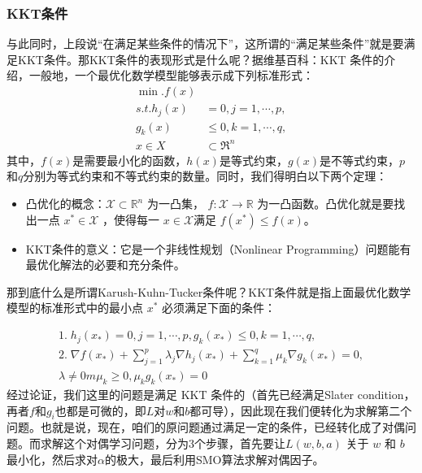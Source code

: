 \documentclass[a4paper,12pt]{article}
\begin{document}
\subsubsection{KKT条件}
与此同时，上段说“在满足某些条件的情况下”，这所谓的“满足某些条件”就是要满足KKT条件。那KKT条件的表现形式是什么呢？据维基百科：KKT 条件的介绍，一般地，一个最优化数学模型能够表示成下列标准形式：
\begin{equation}
\begin{split}
  \min.f(x)\\
  s.t. h_j(x)&=0,j=1,\cdots,p,\\
  g_k(x)&\leq0,k=1,\cdots,q,\\
  x\in X&\subset\Re^n
\end{split}
\end{equation}
其中，$f(x)$是需要最小化的函数，$h(x)$是等式约束，$g(x)$是不等式约束，$p$和$q$分别为等式约束和不等式约束的数量。同时，我们得明白以下两个定理：
\begin{itemize}
  \item 凸优化的概念：$\mathcal{X} \subset \mathbb{R}^n$ 为一凸集， $f:\mathcal{X}\to \mathbb{R}$ 为一凸函数。凸优化就是要找出一点 $x^\ast \in \mathcal{X}$ ，使得每一 $x \in \mathcal{X} $满足 $f(x^\ast)\le f(x) $。
  \item KKT条件的意义：它是一个非线性规划（Nonlinear Programming）问题能有最优化解法的必要和充分条件。
\end{itemize}

那到底什么是所谓Karush-Kuhn-Tucker条件呢？KKT条件就是指上面最优化数学模型的标准形式中的最小点 $x^*$ 必须满足下面的条件：

\begin{equation}
  \begin{split}
  1.\;h_j(x_*)=0,j=1,\cdots,p,g_k(x_*)\leq0,k=1,\cdots,q,\\
  2.\;\nabla f(x_*)+\sum_{j=1}^p\lambda_j\nabla h_j(x_*)+\sum_{k=1}^q\mu_k\nabla g_k(x_*)=0,\\
  \lambda\neq0m\mu_k\geq0,\mu_kg_k(x_*)=0
\end{split}
\end{equation}
经过论证，我们这里的问题是满足 KKT 条件的（首先已经满足Slater condition，再者$f$和$g_i$也都是可微的，即$L$对$w$和$b$都可导），因此现在我们便转化为求解第二个问题。也就是说，现在，咱们的原问题通过满足一定的条件，已经转化成了对偶问题。而求解这个对偶学习问题，分为3个步骤，首先要让$L(w,b,a)$ 关于 $w$ 和 $b$ 最小化，然后求对$\alpha$的极大，最后利用SMO算法求解对偶因子。
\end{document}
